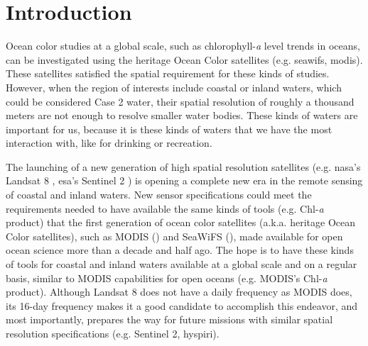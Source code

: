 \chapter{Introduction}
\label{ch:introduction} 


Ocean color studies at a global scale, such as chlorophyll-{\it a} level trends in oceans, can be investigated using the heritage Ocean Color satellites (e.g. \acrfull{seawifs}, \acrfull{modis}). These satellites satisfied the spatial requirement for these kinds of studies. However, when the region of interests include coastal or inland waters, which could be considered Case 2 water, their spatial resolution of roughly a thousand meters are not enough to resolve smaller water bodies. These kinds of waters are important for us, because it is these kinds of waters that we have the most interaction with, like for drinking or recreation. 

The launching of a new generation of high spatial resolution satellites (e.g. \acrshort{nasa}'s Landsat 8 \cite{Irons:2012}, \acrshort{esa}'s Sentinel 2 \cite{Malenovsky:2012}) is opening a complete new era in the remote sensing of coastal and inland waters. New sensor specifications could meet the requirements needed to have available the same kinds of tools (e.g. Chl-{\it a} product) that the first generation of ocean color satellites (a.k.a. heritage Ocean Color satellites), such as MODIS (\cite{Esaias1998}) and SeaWiFS (\cite{McClain2004}), made available for open ocean science more than a decade and half ago. The hope is to have these kinds of tools for coastal and inland waters available at a global scale and on a regular basis, similar to MODIS capabilities for open oceans (e.g. MODIS's Chl-{\it a} product). Although Landsat 8 does not have a daily frequency as MODIS does, its 16-day frequency makes it a good candidate to accomplish this endeavor, and most importantly, prepares the way for future missions with similar spatial resolution specifications (e.g. Sentinel 2, \acrfull{hyspiri}).

